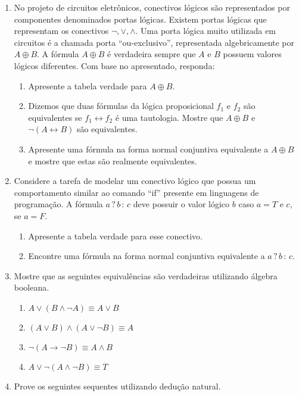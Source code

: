 \documentclass[11pt,a4paper]{report}
\begin{document}
\begin{enumerate}
\begin{enumerate}
   \end{enumerate}
   \item No projeto de circuitos eletr\^onicos, conectivos l\'ogicos s\~ao representados por componentes denominados portas l\'ogicas.
         Existem portas l\'ogicas que representam os conectivos $\neg, \lor, \land$. Uma porta l\'ogica muito utilizada em circuitos
         \'e a chamada porta ``ou-exclusivo'', representada algebricamente por $A \oplus B$. A f\'ormula $A\oplus B$ \'e verdadeira
         sempre que $A$ e $B$ possuem valores l\'ogicos diferentes.
         Com base no apresentado, responda:
   \begin{enumerate}
     \item Apresente a tabela verdade para $A\oplus B$.
     \item Dizemos que duas f\'ormulas da l\'ogica proposicional $f_1$ e $f_2$ s\~ao equivalentes se $f_1 \leftrightarrow f_2$ \'e uma
           tautologia. Mostre que $A \oplus B$ e $\neg (A \leftrightarrow B)$ s\~ao equivalentes.
     \item Apresente uma f\'ormula na forma normal conjuntiva equivalente a $A\oplus B$ e mostre que estas s\~ao realmente equivalentes.
   \end{enumerate}
   \item Considere a tarefa de modelar um conectivo l\'ogico que possua um
     comportamento similar ao comando ``if'' presente em linguagens de
     programa\c{c}\~ao. A f\'ormula $a\,?\,b\,:\,c$ deve possuir o valor
     l\'ogico $b$ caso $a = T$ e $c$, se $a = F$.
   \begin{enumerate}
     \item Apresente a tabela verdade para esse conectivo.
     \item Encontre uma f\'ormula na forma normal conjuntiva equivalente a $a\,?\,b\,:\,c$.
   \end{enumerate}
   \item Mostre que as seguintes equival\^encias s\~ao verdadeiras utilizando \'algebra booleana.
   \begin{enumerate}
     \item $A \lor (B \land \neg A) \equiv A \lor B$
     \item $(A \lor B)\land (A \lor \neg B) \equiv A$
     \item $\neg (A \rightarrow \neg B) \equiv A \land B$
     \item $A \lor \neg (A \land \neg B) \equiv T$
   \end{enumerate}
   \item Prove os seguintes sequentes utilizando dedu\c{c}\~ao natural.

\end{enumerate}
\end{document}
